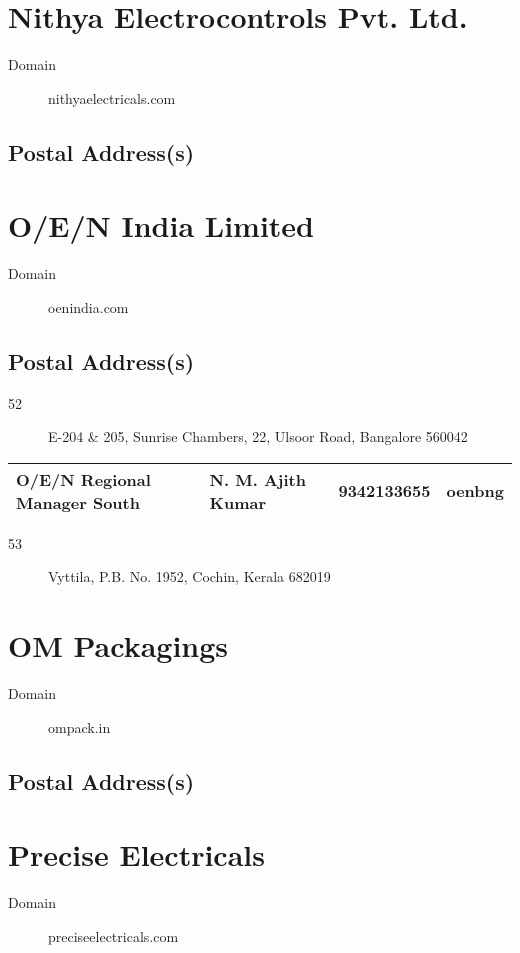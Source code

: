 \documentclass[a4paper, 11pt, twoside]{book}
\begin{document}
\section{Nithya Electrocontrols Pvt. Ltd.}\label{com:60}
\begin{description}
\item[Domain]nithyaelectricals.com
\end{description}
\subsection*{Postal Address(s)}
\section{O/E/N India Limited}\label{com:39}
\begin{description}
\item[Domain]oenindia.com
\end{description}
\subsection*{Postal Address(s)}
\begin{description}
\item [52]E-204 \& 205, Sunrise Chambers, 22, Ulsoor Road, Bangalore 560042
\end{description}
\begin{tabular}{|p{4cm}|p{2cm}|p{2cm}|p{3cm}|}
\hline
O/E/N Regional Manager South & N. M. Ajith Kumar & 9342133655 & oenbng \\ \hline
\end{tabular}
\begin{description}
\item [53]Vyttila, P.B. No. 1952, Cochin, Kerala 682019
\end{description}
\section{OM Packagings}\label{com:51}
\begin{description}
\item[Domain]ompack.in
\end{description}
\subsection*{Postal Address(s)}
\section{Precise Electricals}\label{com:13}
\begin{description}
\item[Domain]preciseelectricals.com
\end{description}
\end{document}
